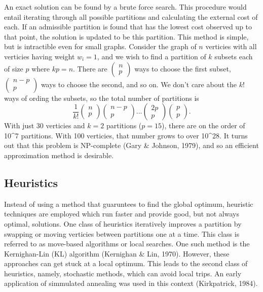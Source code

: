 \documentclass[11pt,]{article}
\begin{document}
An exact solution can be found by a brute force search. This procedure
would entail iterating through all possible partitions and calculating
the external cost of each. If an admissible partition is found that has
the lowest cost observed up to that point, the solution is updated to be
this partition. This method is simple, but is intractible even for small
graphs. Consider the graph of \(n\) verticies with all verticies having
weight \(w_i = 1\), and we wish to find a partition of \(k\) subsets
each of size \(p\) where \(kp = n\). There are
\(\left(\begin{matrix} n \\ p \end{matrix}\right)\) ways to choose the
first subset, \(\left(\begin{matrix} n - p \\ p \end{matrix}\right)\)
ways to choose the second, and so on. We don't care about the \(k!\)
ways of ording the subsets, so the total number of partitions is \[
\frac{1}{k!}\left(\begin{matrix} n \\ p \end{matrix}\right)
\left(\begin{matrix} n-p \\ p \end{matrix}\right)
...
\left(\begin{matrix} 2p \\ p \end{matrix}\right)
\left(\begin{matrix} p \\ p \end{matrix}\right).
\] With just 30 verticies and \(k=2\) partitions (\(p = 15\)), there are
on the order of 10\^{}7 partitions. With 100 verticies, that number
grows to over 10\^{}28. It turns out that this problem is NP-complete
(Gary \& Johnson, 1979), and so an efficient approximation method is
desirable.

\subsection{Heuristics}\label{heuristics}

Instead of using a method that guaruntees to find the global optimum,
heuristic techniques are employed which run faster and provide good, but
not always optimal, solutions. One class of heuristics iteratively
improves a partition by swapping or moving verticies between partitions
one at a time. This class is referred to as move-based algorithms or
local searches. One such method is the Kernighan-Lin (KL) algorithm
(Kernighan \& Lin, 1970). However, these approaches can get stuck at a
local optimum. This leads to the second class of heuristics, namely,
stochastic methods, which can avoid local trips. An early application of
simmulated annealing was used in this context (Kirkpatrick, 1984).
\end{document}
